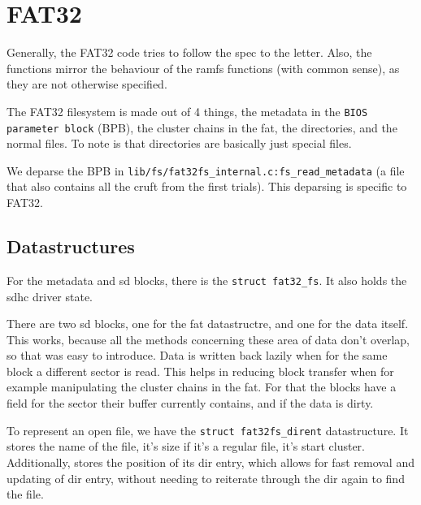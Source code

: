 \section{FAT32}

Generally, the FAT32 code tries to follow the spec to the letter.
Also, the functions mirror the behaviour of the ramfs functions (with common
sense), as they are not otherwise specified.

The FAT32 filesystem is made out of 4 things, the metadata in the
\verb|BIOS parameter block| (BPB), the cluster chains in the fat, the
directories, and the normal files.
To note is that directories are basically just special files.

We deparse the BPB in \verb|lib/fs/fat32fs_internal.c:fs_read_metadata|
(a file that also contains all the cruft from the first trials).
This deparsing is specific to FAT32.

\subsection{Datastructures}

For the metadata and sd blocks, there is the \verb|struct fat32_fs|.
It also holds the sdhc driver state.

There are two sd blocks, one for the fat datastructre, and one for the data
itself.
This works, because all the methods concerning these area of data don't overlap,
so that was easy to introduce.
Data is written back lazily when for the same block a different sector is read.
This helps in reducing block transfer when for example manipulating the cluster
chains in the fat.
For that the blocks have a field for the sector their buffer currently contains,
and if the data is dirty.

To represent an open file, we have the \verb|struct fat32fs_dirent|
datastructure.
It stores the name of the file, it's size if it's a regular file, it's start
cluster.
Additionally, stores the position of its dir entry, which allows for fast
removal and updating of dir entry, without needing to reiterate through the dir
again to find the file.

